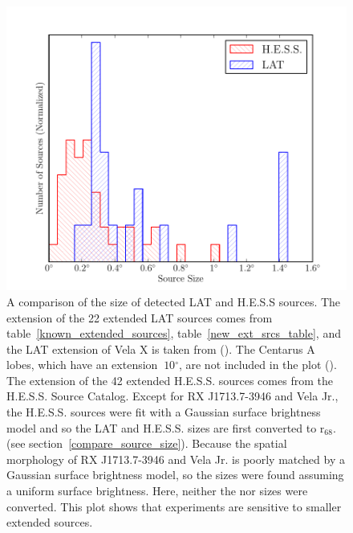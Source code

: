 \documentclass[12pt,preprint]{aastex}
\newcommand{\gev}{\text{GeV}\xspace}
\newcommand{\tev}{\text{TeV}\xspace}
\newcommand{\rsixeight}{{\ensuremath{\text{r}_{68}}}\xspace}
\renewcommand{\deg}{\ensuremath{^\circ}\xspace}
\begin{document}
\clearpage
\begin{figure}
  \begin{center}
    \includegraphics{summary_plots/gev_vs_tev_histogram.pdf}
    \end{center}
    \caption{
    A comparison of the size of detected LAT and H.E.S.S sources.
    The extension of the 22 extended LAT sources comes from
    table~\ref{known_extended_sources}, table~\ref{new_ext_srcs_table},
    and the LAT extension of Vela X is taken from (\cite{velax}). The
    Centarus A lobes, which have an extension $~10\deg$, are not
    included in the plot (\cite{cen_a_lat}).  The \tev extension of
    the 42 extended H.E.S.S. sources comes from the H.E.S.S. Source
    Catalog\cite{hesscat}.
    Except for RX J1713.7-3946 and Vela Jr.,
    the H.E.S.S. sources were fit with a Gaussian surface
    brightness model and
    so the LAT and H.E.S.S. sizes are first converted to \rsixeight.
    (see section~\ref{compare_source_size}). Because the spatial
    morphology of RX J1713.7-3946 and Vela Jr. is poorly matched by a
    Gaussian surface brightness model, so the \tev sizes 
    were found assuming a uniform surface brightness. Here,
    neither the \gev nor \tev sizes were converted.  This plot
    shows that \tev experiments are sensitive to smaller extended sources.
    }\label{gev_vs_tev_histogram}
  \end{figure}
\end{document}
